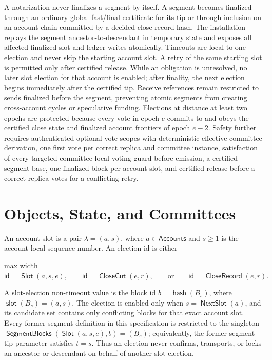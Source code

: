 \documentclass[sigplan,twocolumn,review,anonymous]{acmart}
\newcommand{\func}[1]{\operatorname{\mathsf{#1}}}
\newcommand{\hash}{\func{hash}}
\newcommand{\id}{\mathsf{id}}
\newcommand{\Slot}{\func{Slot}}
\newcommand{\NextSlot}{\func{NextSlot}}
\newcommand{\SegmentBlocks}{\func{SegmentBlocks}}
\newcommand{\CloseCut}{\func{CloseCut}}
\newcommand{\CloseRecord}{\func{CloseRecord}}
\newcommand{\slotOf}{\func{slot}}
\begin{document}
A notarization never finalizes a segment by itself.  A segment becomes finalized through an ordinary
global fast/final certificate for its tip or through inclusion on an account chain committed by a
decided close-record hash.  The installation replays the segment ancestor-to-descendant in temporary
state and exposes all affected finalized-slot and ledger writes atomically.  Timeouts are local to one
election and never skip the starting account slot.  A retry of the same starting slot is permitted only
after certified release.  While an obligation is unresolved, no later slot election for that account is
enabled; after finality, the next election begins immediately after the certified tip.  Receive
references remain restricted to sends finalized before the segment, preventing atomic segments from
creating cross-account cycles or speculative funding.  Elections at distance at least two epochs are
protected because every vote in epoch \(e\) commits to and obeys the certified close state and finalized
account frontiers of epoch \(e-2\).  Safety further requires authenticated optional vote scopes with
deterministic effective-committee derivation, one first vote per correct replica and committee instance,
satisfaction of every targeted committee-local voting guard before emission, a certified segment base,
one finalized block per account slot, and certified release before a correct replica votes for a
conflicting retry.

\section{Objects, State, and Committees}

An account slot is a pair \(\lambda=(a,s)\), where \(a\in\mathsf{Accounts}\) and
\(s\ge1\) is the account-local sequence number.  An election id is either
\begin{center}
\begin{adjustbox}{max width=\columnwidth}
\(\displaystyle
    \id=\Slot(a,s,e),\qquad \id=\CloseCut(e,r),\qquad\text{or}\qquad
    \id=\CloseRecord(e,r).
\)
\end{adjustbox}
\end{center}
A slot-election non-timeout value is the block id \(b=\hash(B_s)\), where
\(\slotOf(B_s)=(a,s)\).  The election is enabled only when \(s=\NextSlot(a)\), and its candidate set
contains only conflicting blocks for that exact account slot.  Every former segment definition in this
specification is restricted to the singleton \(\SegmentBlocks(\Slot(a,s,e),b)=(B_s)\); equivalently,
the former segment-tip parameter satisfies \(t=s\).  Thus an election never confirms, transports, or
locks an ancestor or descendant on behalf of another slot election.
\end{document}
